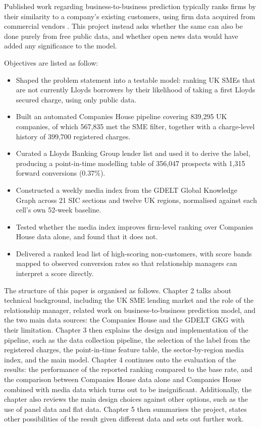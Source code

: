 \documentclass[ %
                    author={Natchalin Iwsakul \\[0.4em] Inkaphol Siriwongwattana \\[0.4em] Tanaphan Kummaraphat \\[0.6em] Patorn Srisupap},,
                supervisor={Fernando Moreno-Pino},
                    degree={MSc},
                     title={Propensity Modelling for SME Commercial Lending Using Open Public Data
},
                  subtitle={Companies House and GDELT as predictors of first-time borrowing},
                      type={},
                      year={2026}]{dissertation}
\begin{document}
Published work regarding business-to-business prediction typically ranks firms by their similarity to a company's existing customers, using firm data acquired from commercial vendors \cite{dhaen_model}. This project instead asks whether the same can also be done purely from free public data, and whether open news data would have added any significance to the model.

Objectives are listed as follow:
\begin{itemize}
  \item Shaped the problem statement into a testable model: ranking
        UK SMEs that are not currently Lloyds borrowers by their likelihood of
        taking a first Lloyds secured charge, using only
        public data.
  \item Built an automated Companies House pipeline covering 839,295 UK
        companies, of which 567,835 met the SME filter, together with a
        charge-level history of 399,700 registered charges.
  \item Curated a Lloyds Banking Group lender list and used it to derive the
        label, producing a point-in-time modelling table of 356,047 prospects
        with 1,315 forward conversions (0.37\%).
  \item Constructed a weekly media index from the GDELT Global Knowledge Graph
        across 21 SIC sections and twelve UK regions, normalised against each
        cell's own 52-week baseline.
  \item Tested whether the media index improves firm-level ranking over
        Companies House data alone, and found that it does not.
  \item Delivered a ranked lead list of high-scoring non-customers, with score
        bands mapped to observed conversion rates so that relationship
        managers can interpret a score directly.
\end{itemize}

The structure of this paper is organised as follows. Chapter 2 talks about technical background, including the UK SME lending market and the role of the relationship manager, related work on business-to-business prediction model, and the two main data sources: the Companies House and the GDELT GKG with their limitation. Chapter 3 then explains the design and implementation of the pipeline, such as the data collection pipeline, the selection of the label from the registered charges, the point-in-time feature table, the sector-by-region media index, and the main model. Chapter 4 continues onto the evaluation of the results: the performance of the reported ranking compared to the base rate, and the comparison between Companies House data alone and Companies House combined with media data which turns out to be insignificant. Additionally, the chapter also reviews the main design choices against other options, such as the use of panel data and flat data. Chapter 5 then summarises the project, states other possibilities of the result given different data and sets out further work.
\end{document}
